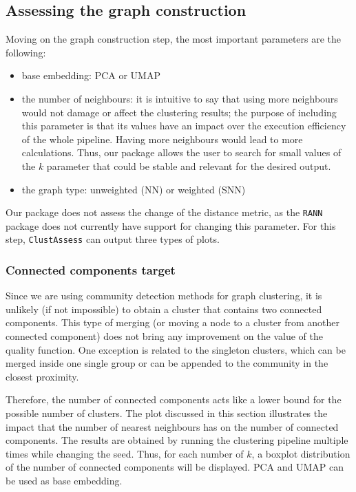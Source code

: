 \subsection{Assessing the graph construction}
Moving on the graph construction step, the most important parameters are the following:
\begin{itemize}
    \item base embedding: PCA or UMAP
    \item the number of neighbours: it is intuitive to say that using more neighbours would not damage or affect the clustering results; the purpose of including this parameter is that its values have an impact over the execution efficiency of the whole pipeline. Having more neighbours would lead to more calculations. Thus, our package allows the user to search for small values of the $k$ parameter that could be stable and relevant for the desired output.
    \item the graph type: unweighted (NN) or weighted (SNN)
\end{itemize}

Our package does not assess the change of the distance metric, as the \verb|RANN| package does not currently have support for changing this parameter.
For this step, \verb|ClustAssess| can output three types of plots.

\subsubsection{Connected components target}
Since we are using community detection methods for graph clustering, it is unlikely (if not impossible) to obtain a cluster that contains two connected components. This type of merging (or moving a node to a cluster from another connected component) does not bring any improvement on the value of the quality function. One exception is related to the singleton clusters, which can be merged inside one single group or can be appended to the community in the closest proximity.

Therefore, the number of connected components acts like a lower bound for the possible number of clusters. The plot discussed in this section illustrates the impact that the number of nearest neighbours has on the number of connected components. The results are obtained by running the clustering pipeline multiple times while changing the seed. Thus, for each number of $k$, a boxplot distribution of the number of connected components will be displayed. PCA and UMAP can be used as base embedding. 

